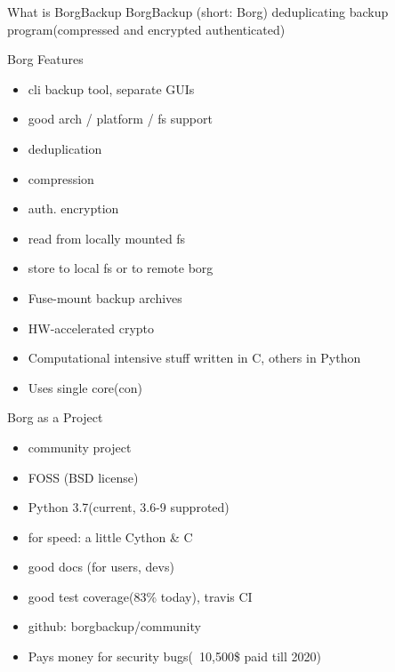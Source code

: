\documentclass{beamer}
\begin{document}
\begin{frame}{What is BorgBackup}
	BorgBackup (short: Borg) deduplicating backup program(compressed and encrypted authenticated)
\end{frame}

\begin{frame}{Borg Features}
	\begin{itemize}
	\item cli backup tool, separate GUIs

	\item good arch / platform / fs support

	\item deduplication 

	\item compression  

	\item auth. encryption

	\item read from locally mounted fs

	\item store to local fs or to remote borg
	
	\item Fuse-mount backup archives

	\item HW-accelerated crypto
	\item Computational intensive stuff written in C, others in Python
	\item Uses single core(con)
\end{itemize}
\end{frame}

\begin{frame}{Borg as a Project}
	\begin{itemize}
		
	\item community project
	
	\item FOSS  (BSD license)
	
	\item Python 3.7(current, 3.6-9 supproted)
	
	\item for speed:  a little Cython \& C
	
	\item good docs  (for users, devs)
	
	\item good test coverage(83\% today), travis CI
	
	\item github: borgbackup/community
	\item Pays money for security bugs(~10,500\$ paid till 2020)  
\end{itemize}
\end{frame}
\end{document}
